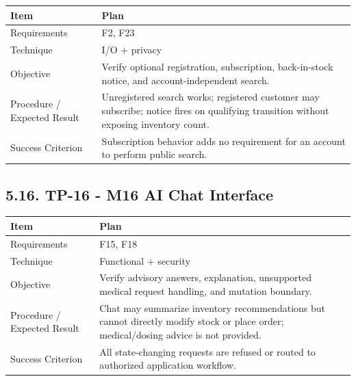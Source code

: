 {\def\LTcaptype{none} %
\begin{longtable}[]{|
  >{\raggedright\arraybackslash}m{}|
  >{\raggedright\arraybackslash}m{}|}
\hline
\begin{minipage}[c]{\linewidth}\raggedright
\textbf{Item}
\end{minipage} & \begin{minipage}[c]{\linewidth}\raggedright
\textbf{Plan}
\end{minipage} \\
\hline
\endhead

\endlastfoot
Requirements & F2, F23 \\ \hline
Technique & I/O + privacy \\ \hline
Objective & Verify optional registration, subscription, back-in-stock notice, and account-independent search. \\ \hline
Procedure / Expected Result & Unregistered search works; registered customer may subscribe; notice fires on qualifying transition without exposing inventory count. \\ \hline
Success Criterion & Subscription behavior adds no requirement for an account to perform public search. \\ \hline
\end{longtable}
}

\subsection{5.16. TP-16 - M16 AI Chat Interface}\label{tp-16---m16-ai-chat-interface}

{\def\LTcaptype{none} %
\begin{longtable}[]{|
  >{\raggedright\arraybackslash}m{}|
  >{\raggedright\arraybackslash}m{}|}
\hline
\begin{minipage}[c]{\linewidth}\raggedright
\textbf{Item}
\end{minipage} & \begin{minipage}[c]{\linewidth}\raggedright
\textbf{Plan}
\end{minipage} \\
\hline
\endhead

\endlastfoot
Requirements & F15, F18 \\ \hline
Technique & Functional + security \\ \hline
Objective & Verify advisory answers, explanation, unsupported medical request handling, and mutation boundary. \\ \hline
Procedure / Expected Result & Chat may summarize inventory recommendations but cannot directly modify stock or place order; medical/dosing advice is not provided. \\ \hline
Success Criterion & All state-changing requests are refused or routed to authorized application workflow. \\ \hline
\end{longtable}
}

